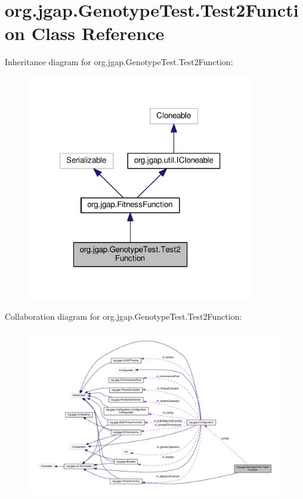 \hypertarget{classorg_1_1jgap_1_1_genotype_test_1_1_test2_function}{\section{org.\-jgap.\-Genotype\-Test.\-Test2\-Function Class Reference}
\label{classorg_1_1jgap_1_1_genotype_test_1_1_test2_function}
}


Inheritance diagram for org.\-jgap.\-Genotype\-Test.\-Test2\-Function\-:
\nopagebreak
\begin{figure}[H]
\begin{center}
\leavevmode
\includegraphics[width=280pt]{classorg_1_1jgap_1_1_genotype_test_1_1_test2_function__inherit__graph}
\end{center}
\end{figure}


Collaboration diagram for org.\-jgap.\-Genotype\-Test.\-Test2\-Function\-:
\nopagebreak
\begin{figure}[H]
\begin{center}
\leavevmode
\includegraphics[width=350pt]{classorg_1_1jgap_1_1_genotype_test_1_1_test2_function__coll__graph}
\end{center}
\end{figure}
